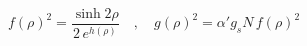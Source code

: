 \begin{equation}
f(\rho)^2 = \frac{\sinh 2\rho}{2 \,e^{h(\rho)}} \quad , \quad
g(\rho)^2 = \alpha' g_s N \, f(\rho)^2
\end{equation}

